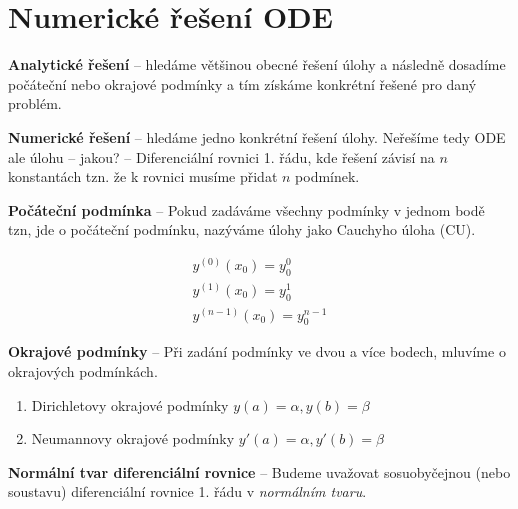 
\chapter{Numerické řešení ODE}

\textbf{Analytické řešení} -- hledáme většinou obecné řešení úlohy a následně dosadíme počáteční nebo okrajové podmínky a tím získáme konkrétní řešené pro daný problém.

\textbf{Numerické řešení} -- hledáme jedno konkrétní řešení úlohy. Neřešíme tedy ODE ale úlohu -- jakou? -- Diferenciální rovnici 1. řádu, kde řešení závisí na $n$ konstantách tzn. že k rovnici musíme přidat $n$ podmínek. 

\textbf{Počáteční podmínka} -- Pokud zadáváme všechny podmínky v jednom bodě tzn, jde o počáteční podmínku, nazýváme úlohy jako Cauchyho úloha (CU).

\begin{align*}
    y^{(0)}(x_0) = y_0^0 \quad \\
    y^{(1)}(x_0) = y_0^1 \quad \\
    y^{(n - 1)}(x_0) = y_0^{n - 1}
\end{align*}

\textbf{Okrajové podmínky} -- Při zadání podmínky ve dvou a více bodech, mluvíme o okrajových podmínkách.

\begin{enumerate}
    \item Dirichletovy okrajové podmínky $y(a) = \alpha, y(b) = \beta$
    \item Neumannovy okrajové podmínky $y'(a) = \alpha, y'(b) = \beta$
\end{enumerate}

\textbf{Normální tvar diferenciální rovnice} -- Budeme uvažovat sosuobyčejnou (nebo soustavu) diferenciální rovnice 1. řádu v \textit{normálním tvaru}. 

